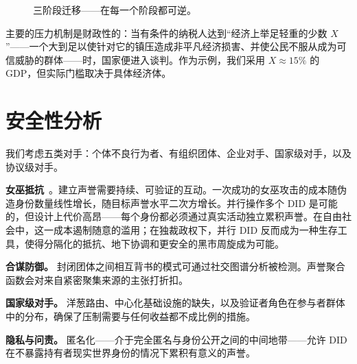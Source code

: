 \documentclass[11pt,a4paper,twocolumn]{article}
\begin{document}
\begin{figure}[ht]
\centering
{}
\caption{三阶段迁移——在每一个阶段都可逆。}
\label{fig:migration}
\end{figure}

主要的压力机制是财政性的：当有条件的纳税人达到“经济上举足轻重的少数 $X$”——一个大到足以使针对它的镇压造成非平凡经济损害、并使公民不服从成为可信威胁的群体——时，国家便进入谈判。作为示例，我们采用 $X \approx 15\%$ 的 GDP，但实际门槛取决于具体经济体。

\section{安全性分析}

我们考虑五类对手：个体不良行为者、有组织团体、企业对手、国家级对手，以及协议级对手。

\textbf{女巫抵抗}~\cite{douceur2002}。建立声誉需要持续、可验证的互动。一次成功的女巫攻击的成本随伪造身份数量线性增长，随目标声誉水平二次方增长。并行操作多个 DID 是可能的，但设计上代价高昂——每个身份都必须通过真实活动独立累积声誉。在自由社会中，这一成本遏制随意的滥用；在独裁政权下，并行 DID 反而成为一种生存工具，使得分隔化的抵抗、地下协调和更安全的黑市周旋成为可能。

\textbf{合谋防御。} 封闭团体之间相互背书的模式可通过社交图谱分析被检测。声誉聚合函数会对来自紧密聚集来源的主张打折扣。

\textbf{国家级对手。} 洋葱路由、中心化基础设施的缺失，以及验证者角色在参与者群体中的分布，确保了压制需要与任何收益都不成比例的措施。

\textbf{隐私与问责。} 匿名化——介于完全匿名与身份公开之间的中间地带——允许 DID 在不暴露持有者现实世界身份的情况下累积有意义的声誉。
\end{document}
